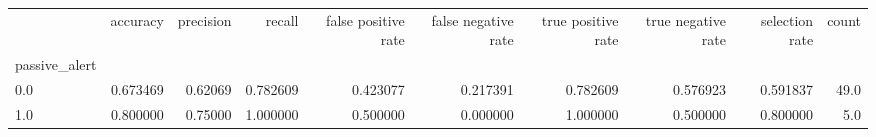 \begin{tabular}{lrrrrrrrrr}
\toprule
{} &  accuracy &  precision &    recall &  false positive rate &  false negative rate &  true positive rate &  true negative rate &  selection rate &  count \\
passive\_alert &           &            &           &                      &                      &                     &                     &                 &        \\
\midrule
0.0           &  0.673469 &    0.62069 &  0.782609 &             0.423077 &             0.217391 &            0.782609 &            0.576923 &        0.591837 &   49.0 \\
1.0           &  0.800000 &    0.75000 &  1.000000 &             0.500000 &             0.000000 &            1.000000 &            0.500000 &        0.800000 &    5.0 \\
\bottomrule
\end{tabular}
